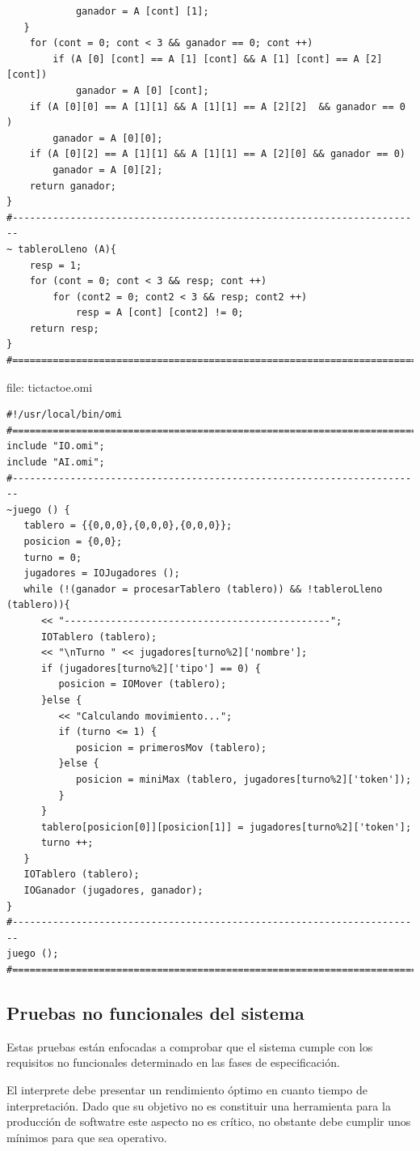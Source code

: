 \begin{lstlisting}
			ganador = A [cont] [1];
   }
	for (cont = 0; cont < 3 && ganador == 0; cont ++)
		if (A [0] [cont] == A [1] [cont] && A [1] [cont] == A [2] [cont])
			ganador = A [0] [cont];
	if (A [0][0] == A [1][1] && A [1][1] == A [2][2]  && ganador == 0 )
		ganador = A [0][0];
	if (A [0][2] == A [1][1] && A [1][1] == A [2][0] && ganador == 0)
		ganador = A [0][2];
	return ganador;
}
#-----------------------------------------------------------------------
~ tableroLleno (A){
	resp = 1;
	for (cont = 0; cont < 3 && resp; cont ++)
		for (cont2 = 0; cont2 < 3 && resp; cont2 ++)
			resp = A [cont] [cont2] != 0;
	return resp;
}
#=======================================================================
\end{lstlisting}

file: tictactoe.omi
\begin{lstlisting}
#!/usr/local/bin/omi
#=======================================================================
include "IO.omi";
include "AI.omi";
#-----------------------------------------------------------------------
~juego () {
   tablero = {{0,0,0},{0,0,0},{0,0,0}};
   posicion = {0,0};
   turno = 0;
   jugadores = IOJugadores ();
   while (!(ganador = procesarTablero (tablero)) && !tableroLleno (tablero)){
      << "----------------------------------------------";
      IOTablero (tablero);
      << "\nTurno " << jugadores[turno%2]['nombre'];
      if (jugadores[turno%2]['tipo'] == 0) {
         posicion = IOMover (tablero);
      }else {
         << "Calculando movimiento...";
         if (turno <= 1) {
            posicion = primerosMov (tablero);
         }else {
            posicion = miniMax (tablero, jugadores[turno%2]['token']);
         }
      }
      tablero[posicion[0]][posicion[1]] = jugadores[turno%2]['token'];
      turno ++;
   }
   IOTablero (tablero);
   IOGanador (jugadores, ganador);
}
#-----------------------------------------------------------------------
juego ();
#======================================================================$
\end{lstlisting}

\subsection{Pruebas no funcionales del sistema}
Estas pruebas están enfocadas a comprobar que el sistema cumple con los requisitos 
no funcionales determinado en las fases de especificación.

El interprete debe presentar un rendimiento óptimo en cuanto tiempo de interpretación. 
Dado que su objetivo no es constituir una herramienta para la producción de softwatre este 
aspecto no es crítico, no obstante debe cumplir unos mínimos para que sea operativo.

